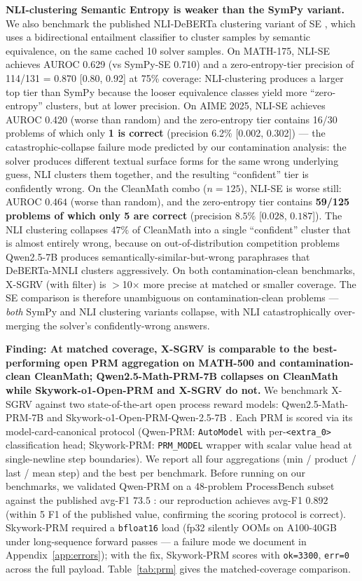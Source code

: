 \documentclass{article}
\begin{document}
\sloppy
\textbf{NLI-clustering Semantic Entropy is weaker than the SymPy variant.} We also benchmark the published NLI-DeBERTa clustering variant of SE \citep{farquhar2024nature}, which uses a bidirectional entailment classifier to cluster samples by semantic equivalence, on the same cached 10 solver samples. On MATH-175, NLI-SE achieves AUROC 0.629 (vs SymPy-SE 0.710) and a zero-entropy-tier precision of 114/131 = 0.870 [0.80, 0.92] at 75\% coverage: NLI-clustering produces a larger top tier than SymPy because the looser equivalence classes yield more ``zero-entropy'' clusters, but at lower precision. On AIME 2025, NLI-SE achieves AUROC 0.420 (worse than random) and the zero-entropy tier contains 16/30 problems of which only \textbf{1 is correct} (precision 6.2\% [0.002, 0.302]) --- the catastrophic-collapse failure mode predicted by our contamination analysis: the solver produces different textual surface forms for the same wrong underlying guess, NLI clusters them together, and the resulting ``confident'' tier is confidently wrong. On the CleanMath combo ($n{=}125$), NLI-SE is worse still: AUROC $0.464$ (worse than random), and the zero-entropy tier contains \textbf{59/125 problems of which only 5 are correct} (precision $8.5\%$ [$0.028$, $0.187$]). The NLI clustering collapses $47\%$ of CleanMath into a single ``confident'' cluster that is almost entirely wrong, because on out-of-distribution competition problems Qwen2.5-7B produces semantically-similar-but-wrong paraphrases that DeBERTa-MNLI clusters aggressively. On both contamination-clean benchmarks, X-SGRV (with filter) is $>$10$\times$ more precise at matched or smaller coverage. The SE comparison is therefore unambiguous on contamination-clean problems --- \emph{both} SymPy and NLI clustering variants collapse, with NLI catastrophically over-merging the solver's confidently-wrong answers.
\fussy

\textbf{Finding: At matched coverage, X-SGRV is comparable to the best-performing open PRM aggregation on MATH-500 and contamination-clean CleanMath; Qwen2.5-Math-PRM-7B collapses on CleanMath while Skywork-o1-Open-PRM and X-SGRV do not.} We benchmark X-SGRV against two state-of-the-art open process reward models: Qwen2.5-Math-PRM-7B \citep{qwenprm2025} and Skywork-o1-Open-PRM-Qwen-2.5-7B \citep{skyworkprm2024}. Each PRM is scored via its model-card-canonical protocol (Qwen-PRM: \texttt{AutoModel} with per-\texttt{<extra\_0>} classification head; Skywork-PRM: \texttt{PRM\_MODEL} wrapper with scalar value head at single-newline step boundaries). We report all four aggregations (min / product / last / mean step) and the best per benchmark. Before running on our benchmarks, we validated Qwen-PRM on a 48-problem ProcessBench subset against the published avg-F1 $73.5$ \citep{qwenprm2025, processbench2024}: our reproduction achieves avg-F1 $0.892$ (within 5 F1 of the published value, confirming the scoring protocol is correct). Skywork-PRM required a \texttt{bfloat16} load (fp32 silently OOMs on A100-40GB under long-sequence forward passes --- a failure mode we document in Appendix~\ref{app:errors}); with the fix, Skywork-PRM scores with \texttt{ok=3300}, \texttt{err=0} across the full payload. Table~\ref{tab:prm} gives the matched-coverage comparison.
\end{document}
